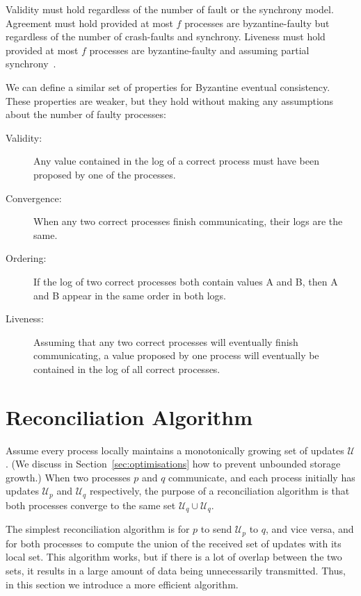 \documentclass[manuscript]{acmart}
\begin{document}
Validity must hold regardless of the number of fault or the synchrony model.
Agreement must hold provided at most $f$ processes are byzantine-faulty but regardless of the number of crash-faults and synchrony. 
Liveness must hold provided at most $f$ processes are byzantine-faulty and assuming partial synchrony~\cite{Dwork:1988}.

We can define a similar set of properties for Byzantine eventual consistency.
These properties are weaker, but they hold without making any assumptions about the number of faulty processes:

\begin{description}
\item[Validity:] Any value contained in the log of a correct process must have been proposed by one of the processes.
\item[Convergence:] When any two correct processes finish communicating, their logs are the same.
\item[Ordering:] If the log of two correct processes both contain values A and B, then A and B appear in the same order in both logs.
\item[Liveness:] Assuming that any two correct processes will eventually finish communicating, a value proposed by one process will eventually be contained in the log of all correct processes.
\end{description}

\section{Reconciliation Algorithm}

Assume every process locally maintains a monotonically growing set of updates $\mathcal{U}$.
(We discuss in Section~\ref{sec:optimisations} how to prevent unbounded storage growth.)
When two processes $p$ and $q$ communicate, and each process initially has updates $\mathcal{U}_p$ and $\mathcal{U}_q$ respectively, the purpose of a reconciliation algorithm is that both processes converge to the same set $\mathcal{U}_q \cup \mathcal{U}_q$.

The simplest reconciliation algorithm is for $p$ to send $\mathcal{U}_p$ to $q$, and vice versa, and for both processes to compute the union of the received set of updates with its local set.
This algorithm works, but if there is a lot of overlap between the two sets, it results in a large amount of data being unnecessarily transmitted.
Thus, in this section we introduce a more efficient algorithm.
\end{document}
